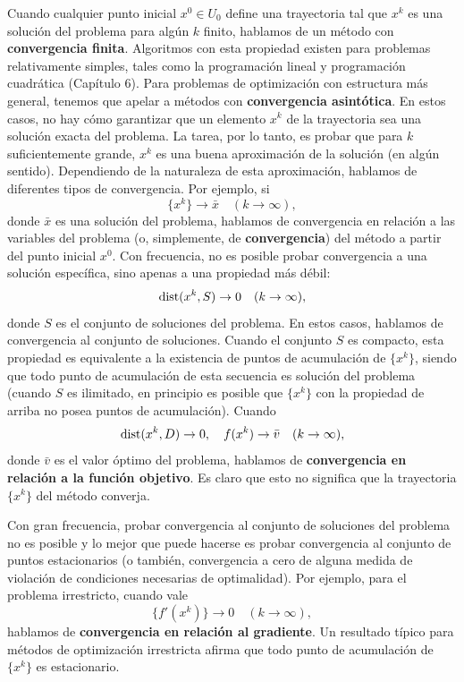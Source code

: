 Cuando cualquier punto inicial $x^0 \in U_0$ define una trayectoria tal que $x^k$ es una solución del problema para algún $k$ finito, hablamos de un método con \textbf{convergencia finita}. Algoritmos con esta propiedad existen para problemas relativamente simples, tales como la programación lineal y programación cuadrática (Capítulo 6). Para problemas de optimización con estructura más general, tenemos que apelar a métodos con \textbf{convergencia asintótica}.
En estos casos, no hay cómo garantizar que un elemento $x^k$ de la trayectoria sea una solución exacta del problema. La tarea, por lo tanto, es probar que para $k$ suficientemente grande, $x^k$ es una buena aproximación de la solución (en algún sentido). Dependiendo de la naturaleza de esta aproximación, hablamos de diferentes tipos de convergencia.
Por ejemplo, si
\[
    \{x^k\} \to \bar{x} \quad (k \to \infty),
\]
donde $\bar{x}$ es una solución del problema, hablamos de convergencia en relación a las variables del problema (o, simplemente, de \textbf{convergencia}) del método a partir del punto inicial $x^0$. Con frecuencia, no es posible probar convergencia a una solución específica, sino apenas a una propiedad más débil:
\[
    \operatorname{dist}(x^k, S) \to 0 \quad (k \to \infty),
\]
donde $S$ es el conjunto de soluciones del problema. En estos casos, hablamos de convergencia al conjunto de soluciones. Cuando el conjunto $S$ es compacto, esta propiedad es equivalente a la existencia de puntos de acumulación de $\{x^k\}$, siendo que todo punto de acumulación de esta secuencia es solución del problema (cuando $S$ es ilimitado, en principio es posible que $\{x^k\}$ con la propiedad de arriba no posea puntos de acumulación).
Cuando
\[
    \operatorname{dist}(x^k, D) \to 0, \quad f(x^k) \to \bar{v} \quad (k \to \infty),
\]
donde $\bar{v}$ es el valor óptimo del problema, hablamos de \textbf{convergencia en relación a la función objetivo}. Es claro que esto no significa que la trayectoria $\{x^k\}$ del método converja.

Con gran frecuencia, probar convergencia al conjunto de soluciones del problema no es posible y lo mejor que puede hacerse es probar convergencia al conjunto de puntos estacionarios (o también, convergencia a cero de alguna medida de violación de condiciones necesarias de optimalidad). Por ejemplo, para el problema irrestricto, cuando vale
\[
    \{f'(x^k)\} \to 0 \quad (k \to \infty),
\]
hablamos de \textbf{convergencia en relación al gradiente}. Un resultado típico para métodos de optimización irrestricta afirma que todo punto de acumulación de $\{x^k\}$ es estacionario.

